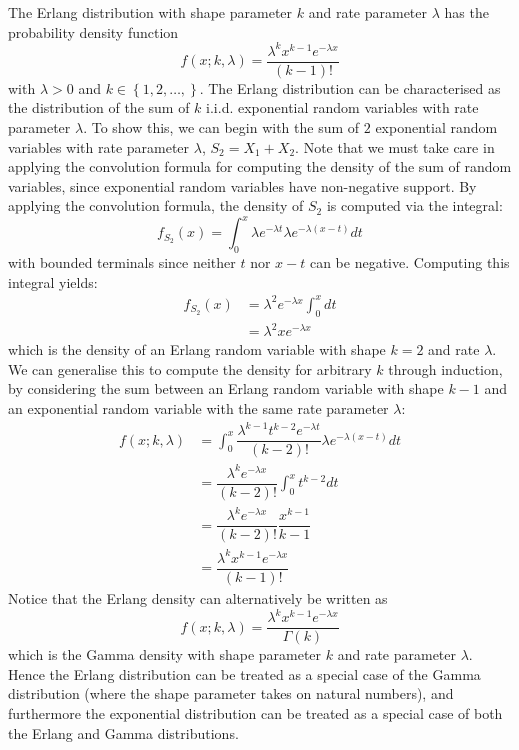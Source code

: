\documentclass[11pt]{report} %
\begin{document}
The Erlang distribution with shape parameter $k$ and rate parameter $\lambda$ has the probability density function
\begin{equation}
f\left(x; k, \lambda\right) = \dfrac{\lambda^{k}x^{k - 1}e^{-\lambda x}}{\left(k - 1\right)!}
\end{equation}
with $\lambda > 0$ and $k \in \left\{1, 2, \dots, \right\}$. The Erlang distribution can be characterised as the distribution of the sum of $k$ i.i.d. exponential random variables with rate parameter $\lambda$. To show this, we can begin with the sum of $2$ exponential random variables with rate parameter $\lambda$, $S_{2} = X_{1} + X_{2}$. Note that we must take care in applying the convolution formula for computing the density of the sum of random variables, since exponential random variables have non-negative support. By applying the convolution formula, the density of $S_{2}$ is computed via the integral:
\begin{equation}
f_{S_{2}}\left(x\right) = \int_{0}^{x}\lambda e^{-\lambda t} \lambda e^{-\lambda\left(x - t\right)} dt
\end{equation}
with bounded terminals since neither $t$ nor $x - t$ can be negative. Computing this integral yields:
\begin{align}
f_{S_{2}}\left(x\right) &= \lambda^{2}e^{-\lambda x}\int_{0}^{x}dt \\
&= \lambda^{2}xe^{-\lambda x}
\end{align}
which is the density of an Erlang random variable with shape $k = 2$ and rate $\lambda$. We can generalise this to compute the density for arbitrary $k$ through induction, by considering the sum between an Erlang random variable with shape $k - 1$ and an exponential random variable with the same rate parameter $\lambda$:
\begin{align}
f\left(x; k, \lambda\right) &= \int_{0}^{x}\dfrac{\lambda^{k - 1}t^{k - 2}e^{-\lambda t}}{\left(k - 2\right)!}\lambda e^{-\lambda \left(x - t\right)} dt \\
&= \dfrac{\lambda^{k}e^{-\lambda x}}{\left(k - 2\right)!}\int_{0}^{x}t^{k - 2}dt \\
&= \dfrac{\lambda^{k}e^{-\lambda x}}{\left(k - 2\right)!}\dfrac{x^{k - 1}}{k - 1} \\
&= \dfrac{\lambda^{k}x^{k - 1}e^{-\lambda x}}{\left(k - 1\right)!}
\end{align}
Notice that the Erlang density can alternatively be written as
\begin{equation}
f\left(x; k, \lambda\right) = \dfrac{\lambda^{k}x^{k - 1}e^{-\lambda x}}{\Gamma\left(k\right)}
\end{equation}
which is the Gamma density with shape parameter $k$ and rate parameter $\lambda$. Hence the Erlang distribution can be treated as a special case of the Gamma distribution (where the shape parameter takes on natural numbers), and furthermore the exponential distribution can be treated as a special case of both the Erlang and Gamma distributions.
\end{document}
